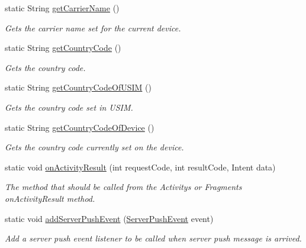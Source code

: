 \begin{DoxyCompactItemize}
static String \hyperlink{classcom_1_1toast_1_1android_1_1gamebase_1_1_gamebase_acd4bf4656730a81853332a4a551e5e9f}{get\+Carrier\+Name} ()
\begin{DoxyCompactList}\small\item\em Gets the carrier name set for the current device. \end{DoxyCompactList}\item 
static String \hyperlink{classcom_1_1toast_1_1android_1_1gamebase_1_1_gamebase_a57662f504668587ba2a1d667a48c9732}{get\+Country\+Code} ()
\begin{DoxyCompactList}\small\item\em Gets the country code. \end{DoxyCompactList}\item 
static String \hyperlink{classcom_1_1toast_1_1android_1_1gamebase_1_1_gamebase_aefed09bea0026a9e6de3c0506ebd5617}{get\+Country\+Code\+Of\+U\+S\+IM} ()
\begin{DoxyCompactList}\small\item\em Gets the country code set in U\+S\+IM. \end{DoxyCompactList}\item 
static String \hyperlink{classcom_1_1toast_1_1android_1_1gamebase_1_1_gamebase_aa5cb9db9a02d57d19f78a34a1adbdc95}{get\+Country\+Code\+Of\+Device} ()
\begin{DoxyCompactList}\small\item\em Gets the country code currently set on the device. \end{DoxyCompactList}\item 
static void \hyperlink{classcom_1_1toast_1_1android_1_1gamebase_1_1_gamebase_a74cd8c74ed834e846c05c598708f1e8b}{on\+Activity\+Result} (int request\+Code, int result\+Code, Intent data)
\begin{DoxyCompactList}\small\item\em The method that should be called from the Activity\textquotesingle{}s or Fragment\textquotesingle{}s on\+Activity\+Result method. \end{DoxyCompactList}\item 
static void \hyperlink{classcom_1_1toast_1_1android_1_1gamebase_1_1_gamebase_a1cae88da5b12ad9563fbfa619870f11b}{add\+Server\+Push\+Event} (\hyperlink{interfacecom_1_1toast_1_1android_1_1gamebase_1_1serverpush_1_1_server_push_event}{Server\+Push\+Event} event)
\begin{DoxyCompactList}\small\item\em Add a server push event listener to be called when server push message is arrived. \end{DoxyCompactList}\item 

\end{DoxyCompactItemize}
